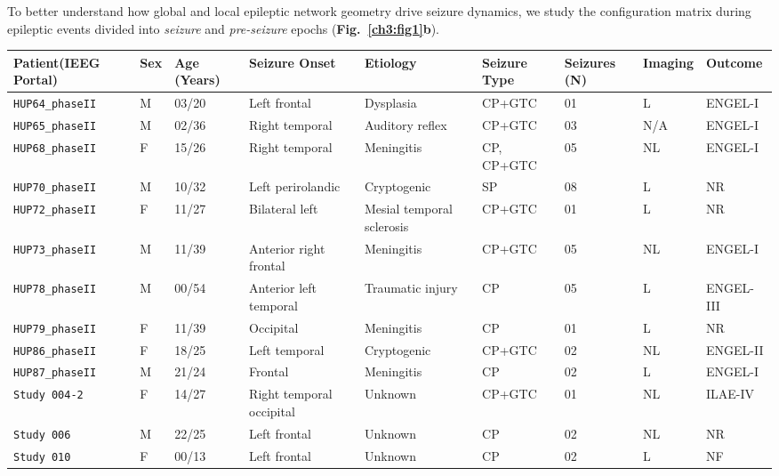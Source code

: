 To better understand how global and local epileptic network geometry drive seizure dynamics, we study the configuration matrix during epileptic events divided into \textit{seizure} and \textit{pre-seizure} epochs (\textbf{Fig.~\ref{ch3:fig1}b}). 

\begin{table}
    \scriptsize
    \centering
    \begin{tabular}{|x{2cm}|x{0.5cm}|x{0.75cm}|x{2cm}|x{1.5cm}|x{1.25cm}|x{1cm}|x{1cm}|x{1.40cm}|}
        \hline
        Patient\newline (IEEG Portal) & Sex & Age (Years) & Seizure Onset & Etiology & Seizure Type & Seizures (N) & Imaging & Outcome \\ \hline \hline
        \verb|HUP64_phaseII| & M & 03/20 & Left frontal & Dysplasia & CP+GTC & 01 & L & ENGEL-I\\ \hline
        \verb|HUP65_phaseII| & M & 02/36 & Right temporal & Auditory reflex & CP+GTC & 03 & N/A & ENGEL-I\\ \hline
        \verb|HUP68_phaseII| & F & 15/26 & Right temporal & Meningitis & CP, CP+GTC & 05 & NL & ENGEL-I\\ \hline
        \verb|HUP70_phaseII| & M & 10/32 & Left perirolandic & Cryptogenic & SP & 08 & L & NR\\ \hline
        \verb|HUP72_phaseII| & F & 11/27 & Bilateral left & Mesial temporal sclerosis & CP+GTC & 01 & L & NR\\ \hline
        \verb|HUP73_phaseII| & M & 11/39 & Anterior right frontal & Meningitis & CP+GTC & 05 & NL & ENGEL-I\\ \hline
        \verb|HUP78_phaseII| & M & 00/54 & Anterior left temporal & Traumatic injury & CP & 05 & L & ENGEL-III\\ \hline
        \verb|HUP79_phaseII| & F & 11/39 & Occipital & Meningitis & CP & 01 & L & NR\\ \hline
        \verb|HUP86_phaseII| & F & 18/25 & Left temporal & Cryptogenic & CP+GTC & 02 & NL & ENGEL-II\\ \hline
        \verb|HUP87_phaseII| & M & 21/24 & Frontal & Meningitis & CP & 02 & L & ENGEL-I\\ \hline
        \verb|Study 004-2|   & F & 14/27 & Right temporal occipital & Unknown & CP+GTC & 01 & NL & ILAE-IV\\ \hline
        \verb|Study 006|     & M & 22/25 & Left frontal & Unknown & CP & 02 & NL & NR\\ \hline
        \verb|Study 010|     & F & 00/13 & Left frontal & Unknown & CP & 02 & L & NF\\ \hline

\end{tabular}
\end{table}
